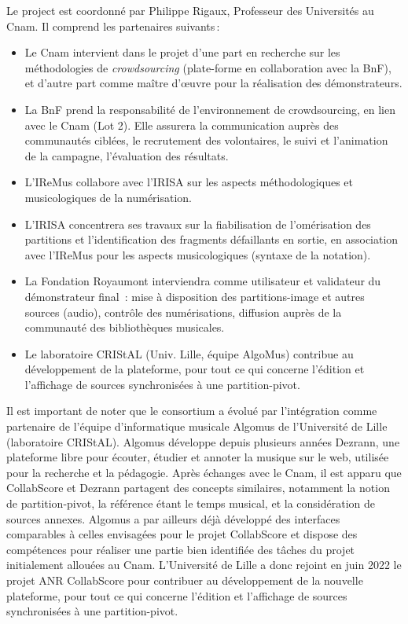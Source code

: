 \documentclass[11pt]{article}
\begin{document}
Le project est coordonné par Philippe Rigaux, Professeur des Universités au Cnam. Il comprend les partenaires suivants\,:

\begin{itemize}
  \item Le Cnam intervient dans le projet d’une part en recherche sur les méthodologies de \textit{crowdsourcing} 
    (plate-forme en collaboration avec la BnF), et d’autre part comme maître d’œuvre pour la réalisation des démonstrateurs.
  \item La BnF prend la responsabilité de l’environnement de crowdsourcing, en lien avec le Cnam (Lot 2). 
    Elle assurera la communication auprès des communautés ciblées, le recrutement des volontaires, 
    le suivi et l’animation de la campagne, l’évaluation des résultats. 
    
   \item L’IReMus collabore avec l’IRISA sur les aspects méthodologiques et musicologiques de la numérisation.
     \item L'IRISA  concentrera ses travaux sur la fiabilisation de l’omérisation des partitions et l’identification 
       des fragments défaillants en sortie, en association avec l’IReMus pour les aspects musicologiques (syntaxe de la notation).
  \item
  La Fondation Royaumont interviendra comme utilisateur et validateur du démonstrateur final : mise à disposition des partitions-image et autres sources (audio), contrôle des numérisations, diffusion auprès de la communauté des bibliothèques musicales. 
 \item Le laboratoire CRIStAL (Univ. Lille, équipe AlgoMus)  contribue
    au développement de la  plateforme, pour tout ce qui concerne l'édition et
  l'affichage de sources synchronisées à une partition-pivot.
\end{itemize}

Il est important de noter que le consortium a évolué par l'intégration comme partenaire
de l’équipe d'informatique musicale Algomus de l’Université de Lille (laboratoire
CRIStAL). Algomus  développe depuis plusieurs années Dezrann, une plateforme libre pour écouter, étudier et annoter
la musique sur le web, utilisée pour la recherche et la pédagogie. Après échanges
avec le Cnam, il est apparu que CollabScore et Dezrann
partagent des concepts similaires, notamment la notion de partition-pivot, la
référence étant le temps musical, et la considération de sources annexes.
Algomus a par ailleurs déjà développé des interfaces comparables à celles
envisagées pour le projet CollabScore et dispose des compétences pour réaliser une
partie bien identifiée des tâches du projet initialement allouées au Cnam. L’Université de Lille 
a donc rejoint en juin 2022 le projet ANR CollabScore pour contribuer
au développement de la nouvelle plateforme, pour tout ce qui concerne l'édition et
l'affichage de sources synchronisées à une partition-pivot.
\end{document}
